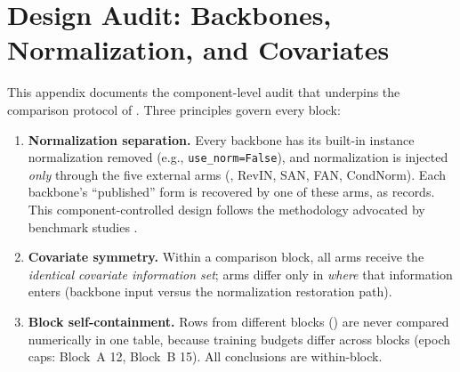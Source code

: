 \section{Design Audit: Backbones, Normalization, and Covariates}\label{app:design}

This appendix documents the component-level audit that underpins the comparison
protocol of . Three principles govern every block:

\begin{enumerate}
\item \textbf{Normalization separation.} Every backbone has its built-in
  instance normalization removed (e.g., \texttt{use\_norm=False}), and
  normalization is injected \emph{only} through the five external arms
  (\rawm{}, RevIN, SAN, FAN, CondNorm). Each backbone's ``published'' form is
  recovered by one of these arms, as  records. This
  component-controlled design follows the methodology advocated by benchmark
  studies \citep{qiu2024tfb}.
\item \textbf{Covariate symmetry.} Within a comparison block, all arms receive
  the \emph{identical covariate information set}; arms differ only in
  \emph{where} that information enters (backbone input versus the
  normalization restoration path).
\item \textbf{Block self-containment.} Rows from different blocks
  () are never compared numerically in one table, because
  training budgets differ across blocks (epoch caps: Block~A 12, Block~B 15).
  All conclusions are within-block.
\end{enumerate}

